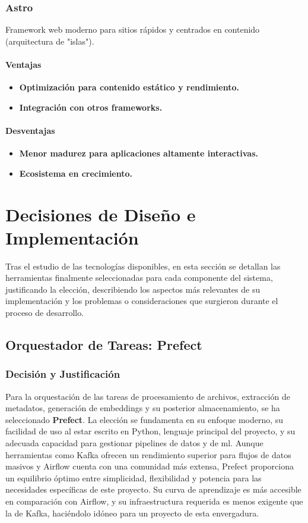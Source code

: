 \subsubsection{Astro}
Framework web moderno para sitios rápidos y centrados en contenido (arquitectura de "islas").
\paragraph{Ventajas}
\begin{itemize}
    \item \textbf{Optimización para contenido estático y rendimiento.}
    \item \textbf{Integración con otros frameworks.}
\end{itemize}
\paragraph{Desventajas}
\begin{itemize}
    \item \textbf{Menor madurez para aplicaciones altamente interactivas.}
    \item \textbf{Ecosistema en crecimiento.}
\end{itemize}

\clearpage
\section{Decisiones de Diseño e Implementación}
\label{sec:decisiones_implementacion}
Tras el estudio de las tecnologías disponibles, en esta sección se detallan las herramientas finalmente seleccionadas para cada componente del sistema, justificando la elección, describiendo los aspectos más relevantes de su implementación y los problemas o consideraciones que surgieron durante el proceso de desarrollo.

\subsection{Orquestador de Tareas: Prefect}
\label{subsec:decision_prefect}
\subsubsection{Decisión y Justificación}
Para la orquestación de las tareas de procesamiento de archivos, extracción de metadatos, generación de embeddings y su posterior almacenamiento, se ha seleccionado \textbf{Prefect}. La elección se fundamenta en su enfoque moderno, su facilidad de uso al estar escrito en Python, lenguaje principal del proyecto, y su adecuada capacidad para gestionar pipelines de datos y de \gls{ml}. Aunque herramientas como Kafka ofrecen un rendimiento superior para flujos de datos masivos y Airflow cuenta con una comunidad más extensa, Prefect proporciona un equilibrio óptimo entre simplicidad, flexibilidad y potencia para las necesidades específicas de este proyecto. Su curva de aprendizaje es más accesible en comparación con Airflow, y su infraestructura requerida es menos exigente que la de Kafka, haciéndolo idóneo para un proyecto de esta envergadura.

